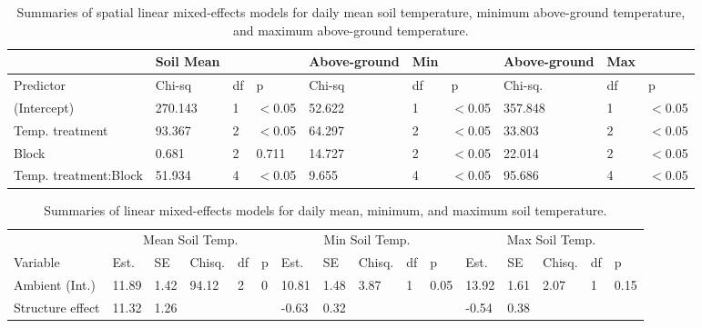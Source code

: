 \documentclass{article}
\begin{document}
\begin{table}[ht]
\centering
\caption{Summaries of spatial linear mixed-effects models for daily mean soil temperature, minimum above-ground temperature, and maximum above-ground temperature.} 
\label{table:blocks_space}
\begin{tabular}{|p{}|p{}p{}p{}|p{}p{}p{}|p{}p{}p{}|}
   \hline
 & Soil   Mean &  &  & Above-ground & Min &  & Above-ground & Max &  \\ 
   \hline
Predictor & Chi-sq & df & p & Chi-sq & df & p & Chi-sq. & df & p \\ 
   \hline
(Intercept) & 270.143 & 1 & $<$0.05 & 52.622 & 1 & $<$0.05 & 357.848 & 1 & $<$0.05 \\ 
  Temp. treatment & 93.367 & 2 & $<$0.05 & 64.297 & 2 & $<$0.05 & 33.803 & 2 & $<$0.05 \\ 
  Block & 0.681 & 2 & 0.711 & 14.727 & 2 & $<$0.05 & 22.014 & 2 & $<$0.05 \\ 
  Temp. treatment:Block & 51.934 & 4 & $<$0.05 & 9.655 & 4 & $<$0.05 & 95.686 & 4 & $<$0.05 \\ 
   \hline
\end{tabular}
\end{table}

\begin{footnotesize} 
\begin{table}[ht]
\centering
\caption{Summaries of linear mixed-effects models for daily mean, minimum, and maximum soil temperature.} 
\label{table:shamamb_soiltemp}
\begin{tabular}{p{}|p{}p{}p{}p{}p{}|p{}p{}p{}p{}p{}|p{}p{}p{}p{}p{}|}
  \hline
  &\multicolumn{5}{c}{Mean Soil Temp.} &\multicolumn{5}{c}{Min Soil Temp.} &\multicolumn{5}{c}{Max Soil Temp.}\\
 Variable & Est. & SE & Chisq. & df & p & Est. & SE & Chisq. & df & p & Est. & SE & Chisq. & df & p\\
 \hline
Ambient (Int.) & 11.89 & 1.42 & 94.12 & 2 & 0 & 10.81 & 1.48 & 3.87 & 1 & 0.05 & 13.92 & 1.61 & 2.07 & 1 & 0.15 \\ 
  Structure effect & 11.32 & 1.26 &  &  &  & -0.63 & 0.32 &  &  &  & -0.54 & 0.38 &  &  &  \\ 
   \hline
\end{tabular}
\end{table}\end{footnotesize} 
\end{document}
